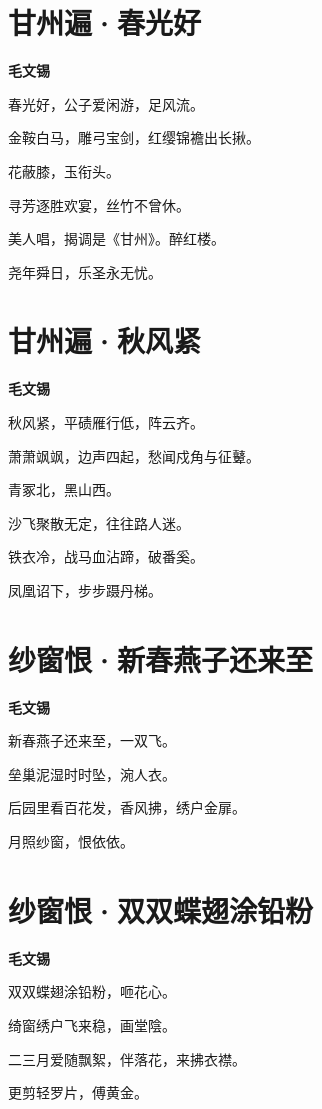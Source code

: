 \documentclass[12pt,a4paper]{ctexbook}
\begin{document}
\section{甘州遍·春光好}
\textbf{毛文锡}\par\vspace{0.5em}
春光好，公子爱闲游，足风流。\par
金鞍白马，雕弓宝剑，红缨锦襜出长揪。\par
花蔽膝，玉衔头。\par
寻芳逐胜欢宴，丝竹不曾休。\par
美人唱，揭调是《甘州》。醉红楼。\par
尧年舜日，乐圣永无忧。\par

\section{甘州遍·秋风紧}
\textbf{毛文锡}\par\vspace{0.5em}
秋风紧，平碛雁行低，阵云齐。\par
萧萧飒飒，边声四起，愁闻戍角与征鼙。\par
青冢北，黑山西。\par
沙飞聚散无定，往往路人迷。\par
铁衣冷，战马血沾蹄，破番奚。\par
凤凰诏下，步步蹑丹梯。\par

\section{纱窗恨·新春燕子还来至}
\textbf{毛文锡}\par\vspace{0.5em}
新春燕子还来至，一双飞。\par
垒巢泥湿时时坠，涴人衣。\par
后园里看百花发，香风拂，绣户金扉。\par
月照纱窗，恨依依。\par

\section{纱窗恨·双双蝶翅涂铅粉}
\textbf{毛文锡}\par\vspace{0.5em}
双双蝶翅涂铅粉，咂花心。\par
绮窗绣户飞来稳，画堂陰。\par
二三月爱随飘絮，伴落花，来拂衣襟。\par
更剪轻罗片，傅黄金。\par
\end{document}
